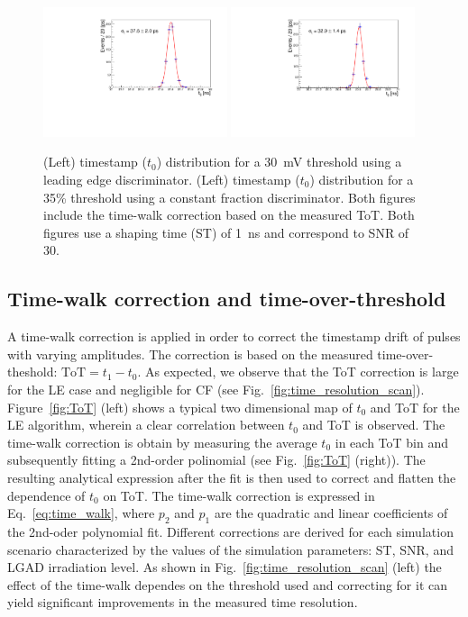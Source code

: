 \documentclass[preprint,1p]{elsarticle}
\begin{document}
  \begin{figure}[htbp]
    \centering
    \includegraphics[width=0.48\textwidth]{figs/pre_rad_st_1ns_snr_30_le_tot_threshold_30mV.pdf} \hfill
    \includegraphics[width=0.48\textwidth]{figs/pre_rad_st_1ns_snr_30_cfd_tot_threshold_35_percent_v2.pdf}
    \caption{(Left) timestamp ($t_{0}$) distribution for a 30~\si{mV} threshold using a leading edge discriminator.
    (Left) timestamp ($t_{0}$) distribution for a 35\% threshold using a constant fraction discriminator. Both figures
    include the time-walk correction based on the measured ToT.
    Both figures use a shaping time (ST) of 1~\si{ns} and correspond to SNR of 30.}
    \label{fig:time_res}
  \end{figure}


\subsection{Time-walk correction and time-over-threshold}\label{sec:tw_and_tot}
A time-walk correction is applied in order to correct the timestamp drift of pulses with varying amplitudes.
The correction is based on the measured time-over-theshold: $\mathrm{ToT} = t_{1} - t_{0}$. As expected, we observe that the ToT correction
is large for the LE case and negligible for CF (see Fig.~\ref{fig:time_resolution_scan}).
Figure~\ref{fig:ToT} (left) shows a typical two dimensional map of $t_{0}$ and ToT for the
LE algorithm, wherein a clear correlation between $t_{0}$ and ToT is observed. The time-walk correction is obtain by measuring the average
$t_{0}$ in each ToT bin and subsequently fitting a 2nd-order polinomial (see Fig.~\ref{fig:ToT} (right)).
The resulting analytical expression after the fit is then used to correct and flatten the dependence of $t_{0}$ on ToT.
The time-walk correction is expressed in Eq.~\ref{eq:time_walk}, where $p_{2}$ and $p_{1}$ are the quadratic
and linear coefficients of the 2nd-oder polynomial fit. Different corrections are derived for each simulation scenario
characterized by the values of the simulation parameters: ST, SNR, and LGAD irradiation level.
As shown in Fig.~\ref{fig:time_resolution_scan} (left) the effect of the time-walk dependes on the threshold used and correcting for it
can yield significant improvements in the measured time resolution.
\end{document}
